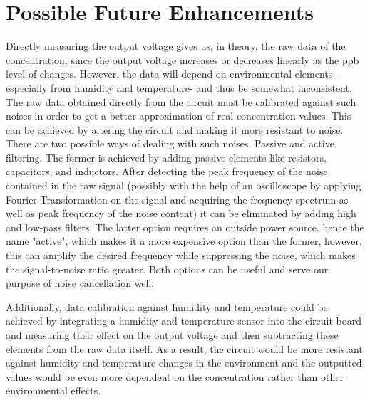 \section{Possible Future Enhancements}
Directly measuring the output voltage gives us, in theory, the raw data of the  concentration, since the output voltage increases or decreases linearly as the ppb level of  changes. However, the data will depend on environmental elements -especially from humidity and temperature- and thus be somewhat inconsistent. The raw data obtained directly from the circuit must be calibrated against such noises in order to get a better approximation of real concentration values. This can be achieved by altering the circuit and making it more resistant to noise. There are two possible ways of dealing with such noises: Passive and active filtering. The former is achieved by adding passive elements like resistors, capacitors, and inductors. After detecting the peak frequency of the noise contained in the raw signal (possibly with the help of an oscilloscope by applying Fourier Transformation on the signal and acquiring the frequency spectrum as well as peak frequency of the noise content) it can be eliminated by adding high and low-pass filters. The latter option requires an outside power source, hence the name "active", which makes it a more expensive option than the former, however, this can amplify the desired frequency while suppressing the noise, which makes the signal-to-noise ratio greater. Both options can be useful and serve our purpose of noise cancellation well.\par 
Additionally, data calibration against humidity and temperature could be achieved by integrating a humidity and temperature sensor into the circuit board and measuring their effect on the output voltage and then subtracting these elements from the raw data itself. As a result, the circuit would be more resistant against humidity and temperature changes in the environment and the outputted values would be even more dependent on the  concentration rather than other environmental effects.\par



